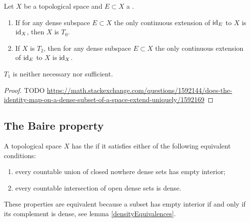 \begin{lemma}
Let $X$ be a topological space and $E\subset X$ a .
\begin{enumerate}
\item If for any dense subspace $E\subset X$ the only continuous extension of $\operatorname{id}_E$ to $X$ is $\operatorname{id}_X$, then $X$ is $T_0$.
\item If $X$ is $T_2$, then for any dense subspace $E\subset X$ the only continuous extension of $\operatorname{id}_E$ to $X$ is $\operatorname{id}_X$. 
\end{enumerate}
$T_1$ is neither necessary nor sufficient.
\end{lemma}
\begin{proof}
TODO \url{https://math.stackexchange.com/questions/1592144/does-the-identity-map-on-a-dense-subset-of-a-space-extend-uniquely/1592169}
\end{proof}


\subsection{The Baire property}
\begin{definition}
A topological space $X$ has the  if it satisfies either of the following equivalent conditions:
\begin{enumerate}
\item every countable union of closed nowhere dense sets has empty interior;
\item every countable intersection of open dense sets is dense.
\end{enumerate}
These properties are equivalent because a subset has empty interior if and only if its complement is dense, see lemma \ref{densityEquivalences}.
\end{definition}


